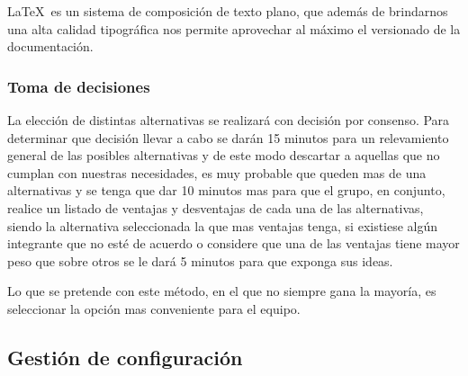 \LaTeX\ es un sistema de composición de texto plano, que además de brindarnos una alta calidad tipográfica nos permite aprovechar al máximo el versionado de la documentación. 
    
\subsubsection{Toma de decisiones}
La elección de distintas alternativas se realizará con decisión por consenso.
Para determinar que decisión llevar a cabo se darán 15 minutos para un relevamiento general de las posibles alternativas y de este modo descartar a aquellas que no cumplan con nuestras necesidades, es muy probable que queden mas de una alternativas y se tenga que dar 10 minutos mas para que el grupo, en conjunto, realice un listado de ventajas y desventajas de cada una de las alternativas, siendo la alternativa seleccionada la que mas ventajas tenga, si existiese  algún integrante que no esté de acuerdo o considere que una de las ventajas tiene mayor peso que sobre otros se le dará 5 minutos para que exponga sus ideas.

Lo que se pretende con este método, en el que no siempre gana la mayoría, es seleccionar la opción mas conveniente para el equipo.





\subsection{Gestión de configuración}

